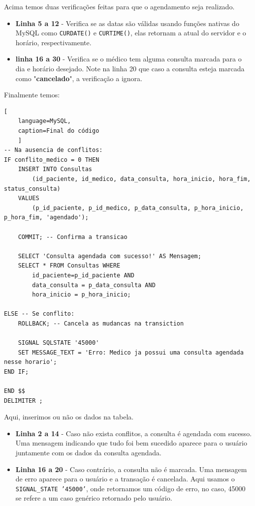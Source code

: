 Acima temos duas verificações feitas para que o agendamento seja realizado.
\begin{itemize}
    \item \textbf{Linha 5 a 12} - Verifica se as datas são válidas usando funções nativas do MySQL como \texttt{CURDATE()} e \texttt{CURTIME()}, elas retornam a atual do servidor e o horário, respectivamente.
    \item \textbf{linha 16  a 30} - Verifica se o médico tem alguma consulta marcada para o dia e horário desejado. Note na linha 20 que caso a consulta esteja marcada como "\textbf{cancelado}", a verificação a ignora.
\end{itemize}

Finalmente temos:

\begin{lstlisting}[
    language=MySQL,
    caption=Final do código
    ]
-- Na ausencia de conflitos:
IF conflito_medico = 0 THEN
    INSERT INTO Consultas 
        (id_paciente, id_medico, data_consulta, hora_inicio, hora_fim, status_consulta)
    VALUES
        (p_id_paciente, p_id_medico, p_data_consulta, p_hora_inicio, p_hora_fim, 'agendado');

    COMMIT; -- Confirma a transicao
    
    SELECT 'Consulta agendada com sucesso!' AS Mensagem;
    SELECT * FROM Consultas WHERE 
        id_paciente=p_id_paciente AND 
        data_consulta = p_data_consulta AND 
        hora_inicio = p_hora_inicio;
    
ELSE -- Se conflito:
    ROLLBACK; -- Cancela as mudancas na transiction    
    
    SIGNAL SQLSTATE '45000'
    SET MESSAGE_TEXT = 'Erro: Medico ja possui uma consulta agendada nesse horario';
END IF;

END $$
DELIMITER ;
\end{lstlisting}

Aqui, inserimos ou não os dados na tabela. \begin{itemize}
    \item \textbf{Linha 2 a 14} - Caso não exista conflitos, a consulta é agendada com sucesso. Uma mensagem indicando que tudo foi bem sucedido aparece para o usuário juntamente com os dados da consulta agendada.
    \item \textbf{Linha 16 a 20} - Caso contrário, a consulta não é marcada. Uma mensagem de erro aparece para o usuário e a transação é cancelada. Aqui usamos o \texttt{SIGNAL\_STATE '45000'}, onde retornamos um código de erro, no caso, 45000 se refere a um caso genérico retornado pelo usuário\cite{MySQL_45000}.
\end{itemize}

